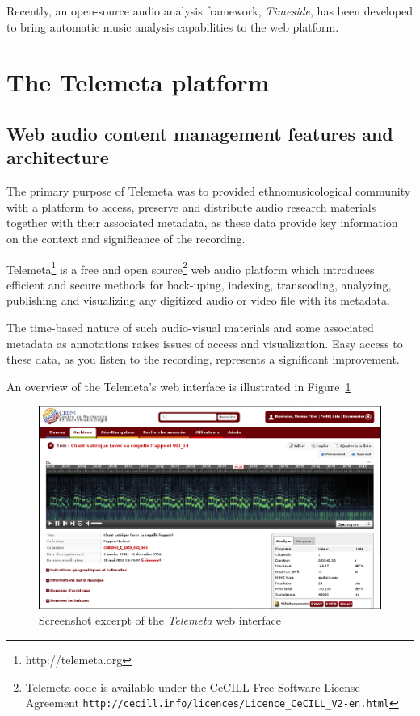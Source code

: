 \documentclass{paper}
\begin{document}
Recently, an open-source audio analysis framework, \emph{Timeside}, has been developed to bring automatic music analysis capabilities to the web platform.

 \section{The Telemeta platform}\label{sec:Telemeta}
 \subsection{Web audio content management features and architecture}
The primary purpose of Telemeta was to provided ethnomusicological community with a platform to access, preserve and distribute audio research materials together with their associated metadata, as these data provide key information on the context and significance of the recording.

 Telemeta\footnote{http://telemeta.org} is a free and open source\footnote{Telemeta code is available under the CeCILL Free Software License Agreement \texttt{http://cecill.info/licences/Licence\_CeCILL\_V2-en.html}} web audio platform which introduces efficient and secure methods for back-uping, indexing, transcoding, analyzing, publishing and visualizing any digitized audio or video file with its metadata.

The time-based nature of such audio-visual materials and some associated metadata as annotations raises issues of access and visualization. Easy access to these data, as you listen to the recording, represents a significant improvement.

 An overview of the Telemeta's web interface is illustrated in Figure~\ref{fig:Telemeta}
 \begin{figure}
   \centering
   \includegraphics[width=0.95\linewidth]{img/telemeta.png}
   \caption[1]{Screenshot excerpt of the \emph{Telemeta} web interface}
    \label{fig:Telemeta}
 \end{figure}
\end{document}
